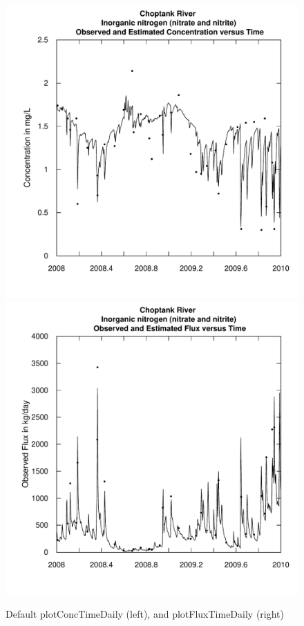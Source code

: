 \documentclass[a4paper,11pt]{article}\usepackage{graphicx, color}
\newenvironment{knitrout}{}{} %
\begin{document}
\begin{knitrout}
\color{fgcolor}\begin{figure}[]

\includegraphics[width=.5\linewidth,height=.5\linewidth]{figure/plotConcTimeDaily1} 
\includegraphics[width=.5\linewidth,height=.5\linewidth]{figure/plotConcTimeDaily2} \caption[Default plotConcTimeDaily (left), and plotFluxTimeDaily (right)]{Default plotConcTimeDaily (left), and plotFluxTimeDaily (right)\label{fig:plotConcTimeDaily}}
\end{figure}


\end{knitrout}
\end{document}
